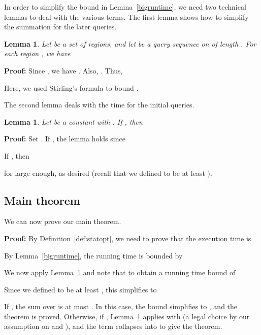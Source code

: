 \documentclass[11pt]{article}
\newtheorem{lemma}[figure]{Lemma}
\newenvironment{proof}{\noindent\textbf{Proof: }\ignorespaces}
  {\hspace*{\fill}\medskip}
\begin{document}
In order to simplify the bound in Lemma~\ref{bigruntime}, we need
two technical lemmas to deal with the various terms. 
The first lemma shows how to simplify the summation for the later queries.

\begin{lemma} \label{longmath} 
Let  be a set of  regions, and let  be a query sequence on
 of length .
For each region , we have

\end{lemma}


\begin{proof} 
Since , we
have . Also,  . Thus,

Here, we used Stirling's formula to bound
.
\end{proof}

The second lemma deals with the time for the initial queries.

\begin{lemma} \label{smallcase} 
Let   be a constant with .
If , then 

\end{lemma}


\begin{proof} 
Set .
If , the lemma holds since 

If , then 

for  large enough, as desired (recall that we defined  to be at least ).
\end{proof}


\subsection{Main theorem} 

We can now prove our main theorem.

\begin{proof}[of Theorem~\ref{main}]
By Definition~\ref{def:statopt}, we need to prove that
the execution time is

By Lemma~\ref{bigruntime}, the running time is bounded by

We now apply Lemma~\ref{longmath} and note that  to obtain 
a running time bound of

Since we defined  to be at least , this simplifies to

If , the sum over  is at most 
. In this case, the bound simplifies 
to ,  and the theorem is proved. Otherwise,
if , Lemma~\ref{smallcase} applies with
 (a legal choice by our assumption on
 and ), and  the term
 collapses into 
to give the theorem.  
\end{proof}
\end{document}
